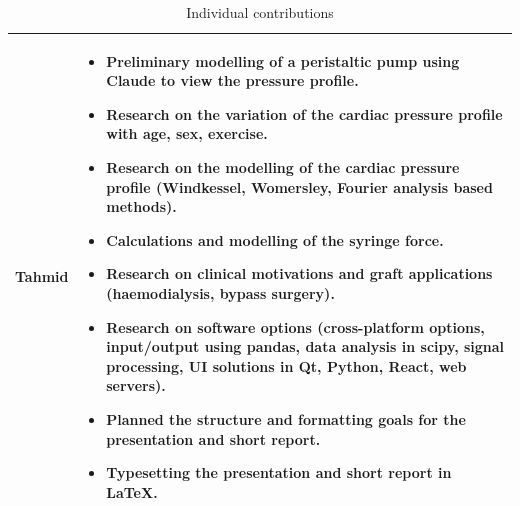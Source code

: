 \documentclass[10pt, a4paper]{article}
\begin{document}
\begin{table}[H]
\begin{tabularx}{\linewidth}{>{\raggedright\arraybackslash}p{1cm} X}
        Tahmid
                      & \begin{itemize}[nosep, leftmargin=*]
                            \item Preliminary modelling of a peristaltic pump using Claude to view the pressure profile.
                            \item Research on the variation of the cardiac pressure profile with age, sex, exercise.
                            \item Research on the modelling of the cardiac pressure profile (Windkessel, Womersley, Fourier analysis based methods).
                            \item Calculations and modelling of the syringe force.
                            \item Research on clinical motivations and graft applications (haemodialysis, bypass surgery).
                            \item Research on software options (cross-platform options, input/output using pandas, data analysis in scipy, signal processing, UI solutions in Qt, Python, React, web servers).
                            \item Planned the structure and formatting goals for the presentation and short report.
                            \item Typesetting the presentation and short report in \LaTeX{}.
                        \end{itemize}                                          \\



        \bottomrule
    \end{tabularx}
    \caption{Individual contributions}
    \label{tab:partition}
\end{table}
\end{document}
